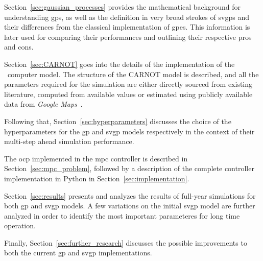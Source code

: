 Section~\ref{sec:gaussian_processes} provides the mathematical background for
understanding \acrshort{gp}s, as well as the definition in very broad strokes of
\acrshort{svgp}s and their differences from the classical implementation of
\acrlong{gp}es. This information is later used for comparing their performances
and outlining their respective pros and cons.

Section~\ref{sec:CARNOT} goes into the details of the implementation of the
\pdome\ computer model. The structure of the CARNOT model is described, and all
the parameters required for the simulation are either directly sourced from
existing literature, computed from available values or estimated using publicly
available data from \textit{Google Maps}~\cite{GoogleMaps}.

Following that, Section~\ref{sec:hyperparameters} discusses the choice of the
hyperparameters for the \acrshort{gp} and \acrshort{svgp} models respectively in
the context of their multi-step ahead simulation performance.

The \acrlong{ocp} implemented in the \acrshort{mpc} controller is described in
Section~\ref{sec:mpc_problem}, followed by a description of the complete
controller implementation in Python in Section~\ref{sec:implementation}.

Section~\ref{sec:results} presents and analyzes the results of full-year
simulations for both \acrshort{gp} and \acrshort{svgp} models. A few variations
on the initial \acrshort{svgp} model are further analyzed in order to identify
the most important parameteres for long time operation.

Finally, Section~\ref{sec:further_research} discusses the possible improvements
to both the current \acrshort{gp} and \acrshort{svgp} implementations.

\clearpage
